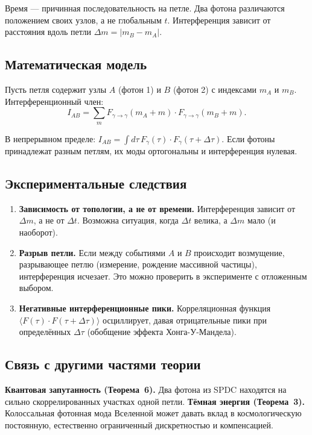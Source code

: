 \documentclass[12pt,a4paper]{article}
\begin{document}
Время --- причинная последовательность на петле. Два фотона различаются положением своих узлов, а не глобальным $t$. Интерференция зависит от расстояния вдоль петли $\Delta m = |m_B - m_A|$.

\subsection{Математическая модель}
Пусть петля содержит узлы $A$ (фотон 1) и $B$ (фотон 2) с индексами $m_A$ и $m_B$. Интерференционный член:
\begin{equation}
    I_{AB} = \sum_{m} F_{\gamma \to \gamma}(m_A + m) \cdot F_{\gamma \to \gamma}(m_B + m).
\end{equation}

В непрерывном пределе: $I_{AB} = \int d\tau \, F_\gamma(\tau) \cdot F_\gamma(\tau + \Delta\tau)$. Если фотоны принадлежат разным петлям, их моды ортогональны и интерференция нулевая.

\subsection{Экспериментальные следствия}
\begin{enumerate}[label=(\arabic*)]
    \item \textbf{Зависимость от топологии, а не от времени.} Интерференция зависит от $\Delta m$, а не от $\Delta t$. Возможна ситуация, когда $\Delta t$ велика, а $\Delta m$ мало (и наоборот).
    \item \textbf{Разрыв петли.} Если между событиями $A$ и $B$ происходит возмущение, разрывающее петлю (измерение, рождение массивной частицы), интерференция исчезает. Это можно проверить в эксперименте с отложенным выбором.
    \item \textbf{Негативные интерференционные пики.} Корреляционная функция $\langle F(\tau) \cdot F(\tau+\Delta\tau) \rangle$ осциллирует, давая отрицательные пики при определённых $\Delta\tau$ (обобщение эффекта Хонга-У-Мандела).
\end{enumerate}

\subsection{Связь с другими частями теории}
\textbf{Квантовая запутанность (Теорема~6).} Два фотона из SPDC находятся на сильно скоррелированных участках одной петли.
\textbf{Тёмная энергия (Теорема~3).} Колоссальная фотонная мода Вселенной может давать вклад в космологическую постоянную, естественно ограниченный дискретностью и компенсацией.
\end{document}

